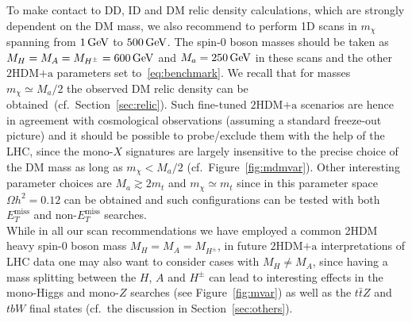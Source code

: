 \documentclass[a4paper, 11pt,notoc]{article}
\newcommand{\MET}{\ensuremath{E_T^\mathrm{miss}}\xspace}
\newcommand{\mA}{\ensuremath{M_{A}}\xspace}
\newcommand{\ma}{\ensuremath{M_{a}}\xspace}
\newcommand{\mH}{\ensuremath{M_{H}}\xspace}
\newcommand{\mHc}{\ensuremath{M_{H^{\pm}}}\xspace}
\newcommand{\hdma}{\ensuremath{\textrm{2HDM+a}}\xspace}
\begin{document}
To make contact to DD, ID and DM relic density calculations, which are strongly dependent on the DM mass, we also recommend to perform 1D scans in $m_\chi$ spanning from $1\, {\rm GeV}$ to $500 \, {\rm GeV}$. The  spin-0 boson masses should be taken as $\mH = \mA = \mHc = 600 \, {\rm GeV}$ and $\ma = 250 \, {\rm GeV}$  in these scans and the other \hdma parameters set to~\eqref{eq:benchmark}. We recall that for masses $m_\chi \simeq \ma/2$ the observed DM relic density can be obtained~(cf.~Section~\ref{sec:relic}). Such fine-tuned \hdma scenarios are hence in agreement with cosmological observations (assuming a standard freeze-out picture) and  it should be possible to probe/exclude them with the help of the LHC, since the mono-$X$ signatures are largely insensitive to the precise choice of the DM mass as long as $m_\chi < \ma/2$  (cf.~Figure~\ref{fig:mdmvar}). Other interesting parameter choices are $M_a \gtrsim 2 m_t$ and $m_\chi \simeq m_t$  since in this parameter space $\Omega h^2 = 0.12$ can be obtained and such configurations can be tested with both $\MET$ and non-$\MET$ searches. \\[2mm]

\noindent While in all our scan recommendations we have employed a common 2HDM heavy  spin-0 boson  mass $\mH = \mA = \mHc$, in future \hdma interpretations of LHC data one may also want to consider cases with $M_H \neq M_A$, since having a mass splitting between the $H$, $A$ and $H^\pm$ can lead to interesting effects in the mono-Higgs and mono-$Z$ searches (see Figure~\ref{fig:mvar}) as well as the $t \bar t Z$ and $tbW$ final states (cf.~the discussion in Section~\ref{sec:others}).  


\acknowledgments 
\end{document}
